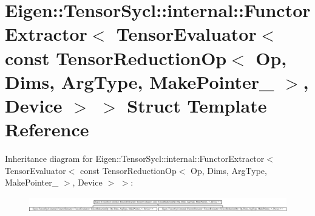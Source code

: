 \hypertarget{struct_eigen_1_1_tensor_sycl_1_1internal_1_1_functor_extractor_3_01_tensor_evaluator_3_01const_08e46bb7792b8f07bb791a4ece83b9c3b}{}\section{Eigen\+:\+:Tensor\+Sycl\+:\+:internal\+:\+:Functor\+Extractor$<$ Tensor\+Evaluator$<$ const Tensor\+Reduction\+Op$<$ Op, Dims, Arg\+Type, Make\+Pointer\+\_\+ $>$, Device $>$ $>$ Struct Template Reference}
\label{struct_eigen_1_1_tensor_sycl_1_1internal_1_1_functor_extractor_3_01_tensor_evaluator_3_01const_08e46bb7792b8f07bb791a4ece83b9c3b}
Inheritance diagram for Eigen\+:\+:Tensor\+Sycl\+:\+:internal\+:\+:Functor\+Extractor$<$ Tensor\+Evaluator$<$ const Tensor\+Reduction\+Op$<$ Op, Dims, Arg\+Type, Make\+Pointer\+\_\+ $>$, Device $>$ $>$\+:\begin{figure}[H]
\begin{center}
\leavevmode
\includegraphics[height=0.674699cm]{struct_eigen_1_1_tensor_sycl_1_1internal_1_1_functor_extractor_3_01_tensor_evaluator_3_01const_08e46bb7792b8f07bb791a4ece83b9c3b}
\end{center}
\end{figure}
